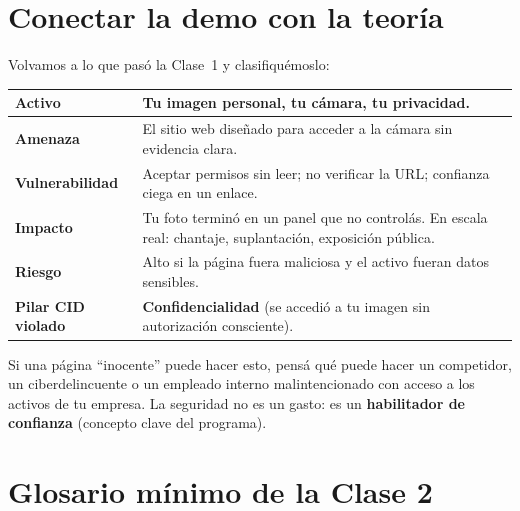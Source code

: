 \documentclass[12pt,a4paper]{article}
\renewcommand{\arraystretch}{1.25}
\begin{document}
\newpage
\section{Conectar la demo con la teor\'ia}

Volvamos a lo que pas\'o la Clase~1 y clasifiqu\'emoslo:

\renewcommand{\arraystretch}{1.5}
\begin{tabularx}{\textwidth}{|>{\bfseries}p{3.2cm}|X|}
\hline
Activo       & Tu imagen personal, tu c\'amara, tu privacidad. \\
\hline
Amenaza      & El sitio web dise\~nado para acceder a la c\'amara sin evidencia clara. \\
\hline
Vulnerabilidad & Aceptar permisos sin leer; no verificar la URL; confianza ciega en un enlace. \\
\hline
Impacto      & Tu foto termin\'o en un panel que no control\'as. En escala real: chantaje, suplantaci\'on, exposici\'on p\'ublica. \\
\hline
Riesgo       & Alto si la p\'agina fuera maliciosa y el activo fueran datos sensibles. \\
\hline
Pilar CID violado & \textbf{Confidencialidad} (se accedi\'o a tu imagen sin autorizaci\'on consciente). \\
\hline
\end{tabularx}

\begin{cajaNota}[title={Lecci\'on para negocios digitales}]
Si una p\'agina ``inocente'' puede hacer esto, pens\'a qu\'e puede hacer un
competidor, un ciberdelincuente o un empleado interno malintencionado con
acceso a los activos de tu empresa. La seguridad no es un gasto: es un
\textbf{habilitador de confianza} (concepto clave del programa).
\end{cajaNota}

\section{Glosario m\'inimo de la Clase 2}
\end{document}
